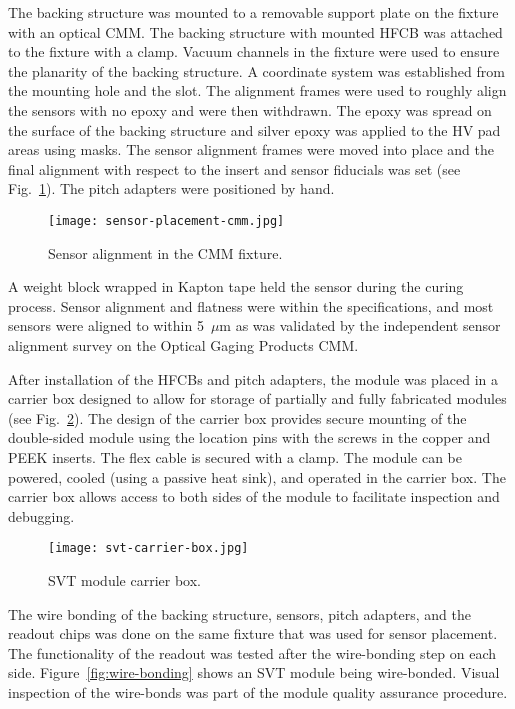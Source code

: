 The backing structure was mounted to a removable support plate on the fixture with an optical CMM. The backing
structure with mounted HFCB was attached to the fixture with a clamp. Vacuum channels in the fixture were used to
ensure the planarity of the backing structure. A coordinate system was established from the mounting hole and the
slot. The alignment frames were used to roughly align the sensors with no epoxy and were then withdrawn. The epoxy
was spread on the surface of the backing structure and silver epoxy was applied to the HV pad areas using masks.
The sensor alignment frames were moved into place and the final alignment with respect to the insert and sensor
fiducials was set (see Fig.~\ref{fig:sensor-placement-cmm}). The pitch adapters were positioned by hand. 
 
\begin{figure}[h] 
\centering 
\texttt{[image: sensor-placement-cmm.jpg]}
\caption{Sensor alignment in the CMM fixture.}
\label{fig:sensor-placement-cmm}
\end{figure}

A weight block wrapped in Kapton tape held the sensor during the curing process. Sensor alignment and flatness
were within the specifications, and most sensors were aligned to within 5~$\mu$m as was validated by the
independent sensor alignment survey on the Optical Gaging Products CMM.

After installation of the HFCBs and pitch adapters, the module was placed in a carrier box designed to allow for
storage of partially and fully fabricated modules (see Fig.~\ref{fig:svt-carrier-box}). The design of the carrier
box provides secure mounting of the double-sided module using the location pins with the screws in the copper and
PEEK inserts. The flex cable is secured with a clamp. The module can be powered, cooled (using a passive heat sink),
and operated in the carrier box. The carrier box allows access to both sides of the module to facilitate inspection
and debugging. 

\begin{figure}[h] 
\centering 
\texttt{[image: svt-carrier-box.jpg]}
\caption{SVT module carrier box.}
\label{fig:svt-carrier-box}
\end{figure}

The wire bonding of the backing structure, sensors, pitch adapters, and the readout chips was done on the same
fixture that was used for sensor placement. The functionality of the readout was tested after the wire-bonding step
on each side. Figure~\ref{fig:wire-bonding} shows an SVT module being wire-bonded. Visual inspection of the
wire-bonds was part of the module quality assurance procedure.

